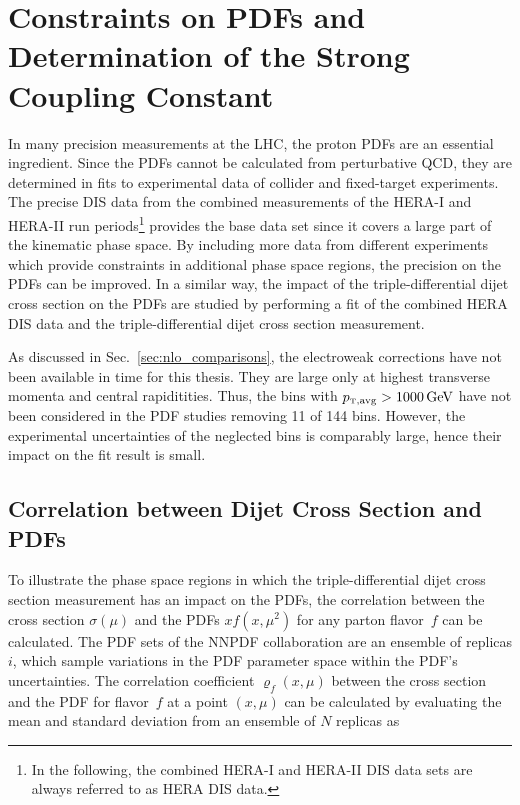 
\chapter{Constraints on PDFs and Determination of the Strong Coupling Constant}
\label{sec:pdf_constraints}

In many precision measurements at the LHC, the proton PDFs are an essential
ingredient. Since the PDFs cannot be calculated from perturbative QCD, they are
determined in fits to experimental data of collider and fixed-target experiments.
The precise DIS data from the combined measurements of the HERA-I and HERA-II
run periods\footnote{In the following, the combined HERA-I and HERA-II DIS data sets
are always referred to as HERA DIS data.} provides the base data set since it
covers a large part of the kinematic phase space. By including more data from different
experiments which provide constraints in additional phase space regions, the
precision on the PDFs can be improved. In a similar way, the impact of the
triple-differential dijet cross section on the PDFs are studied by performing a
fit of the combined HERA DIS data and the triple-differential dijet cross
section measurement.

As discussed in Sec.~\ref{sec:nlo_comparisons}, the electroweak corrections have
not been available in time for this thesis. They are large only at highest
transverse momenta and central rapiditities. Thus, the bins with $\ptavg >
\SI{1000}{\GeV}$ have not been considered in the PDF studies removing 11 of 144
bins.  However, the experimental uncertainties of the neglected bins is
comparably large, hence their impact on the fit result is small.

\section{Correlation between Dijet Cross Section and PDFs}
\label{sec:pdf_sensitivity}

To illustrate the phase space regions in which the triple-differential dijet
cross section measurement has an impact on the PDFs, the correlation between the cross
section $\sigma(\mu)$ and the PDFs $xf(x,\mu^2)$ for any parton flavor~$f$ can be
calculated. The PDF sets of the NNPDF collaboration are an ensemble of replicas
$i$, which sample variations in the PDF parameter space within the PDF's
uncertainties. The correlation coefficient $\varrho_f(x,\mu)$ between the cross
section and the PDF for flavor~$f$ at a point $(x,\mu)$ can be calculated by
evaluating the mean and standard deviation from an ensemble of $N$ replicas as

